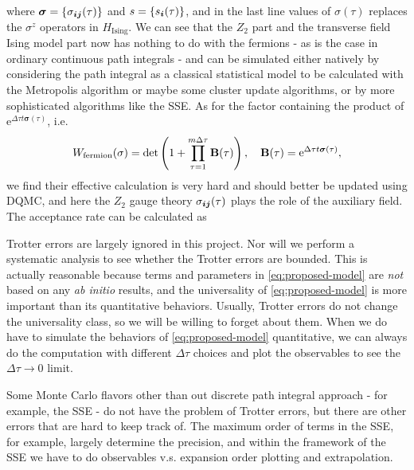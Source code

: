 \documentclass[hyperref, a4paper]{article}
\newcommand*{\ee}{\mathrm{e}}
\newcommand*{\Ztwo}{\texorpdfstring{$\mathbb{Z}_2$ }{Z2 }}
\newcommand*{\tfim}{transverse field Ising model}
\def\mathbb#1{#1}%
\begin{document}
where $\bm{\sigma} = \{\sigma_{\vb*{i} \vb*{j}}(\tau)\}$ and $s = \{s_{\vb*{i}}(\tau)\}$, 
and in the last line values of $\sigma(\tau)$ replaces the $\sigma^z$ operators in $H_\text{Ising}$.
We can see that the \Ztwo part and the \tfim{} part now has nothing to do with the fermions - as is the case in ordinary continuous path integrals - and can be simulated either natively by considering the path integral as a classical statistical model to be calculated with the Metropolis algorithm or maybe some cluster update algorithms, or by more sophisticated algorithms like the SSE.
As for the factor containing the product of $\ee^{\Delta\tau t \bm{\sigma}(\tau)}$, i.e. 
\begin{equation}
    W_\text{fermion}(\sigma) = \det \left(1 + \prod_{\tau = 1}^{m\Delta \tau} \vb{B}(\tau) \right), \quad \vb{B}(\tau) =  \ee^{\Delta \tau t \bm{\sigma}(\tau)},
\end{equation}
we find their effective calculation is very hard and should better be updated using DQMC, and here the \Ztwo gauge theory $\sigma_{\vb*{i} \vb*{j}}(\tau)$ plays the role of the auxiliary field.
The acceptance rate can be calculated as 

Trotter errors are largely ignored in this project. Nor will we perform a systematic analysis to see whether the Trotter errors are bounded.
This is actually reasonable because terms and parameters in \eqref{eq:proposed-model} are \emph{not} based on any \emph{ab initio} results, and the universality of \eqref{eq:proposed-model} is more important than its quantitative behaviors.
Usually, Trotter errors do not change the universality class, so we will be willing to forget about them.
When we do have to simulate the behaviors of \eqref{eq:proposed-model} quantitative, we can always do the computation with different $\Delta \tau$ choices and plot the observables to see the $\Delta \tau \to 0$ limit.

Some Monte Carlo flavors other than out discrete path integral approach - for example, the SSE - do not have the problem of Trotter errors, but there are other errors that are hard to keep track of.
The maximum order of terms in the SSE, for example, largely determine the precision, and within the framework of the SSE we have to do observables v.s. expansion order plotting and extrapolation.
\end{document}
